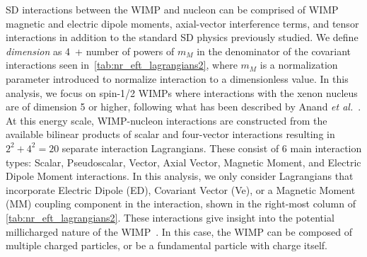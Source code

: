 \documentclass[reprint, showpacs,
preprintnumbers,
amsmath,amssymb,
aps, floatfix,
superscriptaddress,
prd, nofootinbib]{revtex4-1}
\begin{document}
SD interactions between the WIMP and nucleon can be comprised of WIMP magnetic and electric dipole moments, axial-vector interference terms, and tensor interactions in addition to the standard SD physics previously studied. 
We define \textit{dimension} as 4~+ number of powers of $m_{M}$ in the denominator of the covariant interactions seen in~\autoref{tab:nr_eft_lagrangians2}, where $m_{M}$ is a normalization parameter introduced to normalize interaction to a dimensionless value. 
In this analysis, we focus on spin-1/2 WIMPs where interactions with the xenon nucleus are of dimension 5 or higher, following what has been described by Anand \textit{et al.}~\cite{Anand:MathematicaEFT}. 
At this energy scale, WIMP-nucleon interactions are constructed from the available bilinear products of scalar and four-vector interactions resulting in $2^2+4^2 = 20$ separate interaction Lagrangians.
These consist of 6 main interaction types: Scalar, Pseudoscalar, Vector, Axial Vector, Magnetic Moment, and Electric Dipole Moment interactions. 
In this analysis, we only consider Lagrangians that incorporate Electric Dipole (ED), Covariant Vector (Ve), or a Magnetic Moment (MM) coupling component in the interaction, shown in the right-most column of \autoref{tab:nr_eft_lagrangians2}.
These interactions give insight into the potential millicharged nature of the WIMP~\cite{Agrawal:2021dbo}. 
In this case, the WIMP can be composed of multiple charged particles, or be a fundamental particle with charge itself. 
\end{document}
